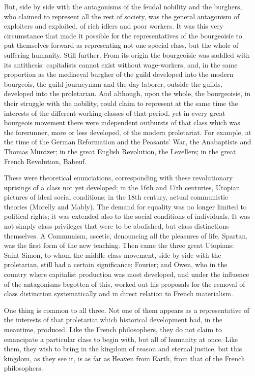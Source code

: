 \documentclass[oneside, 12pt]{book}
\begin{document}
But, side by side with the antagonisms of the feudal nobility and the burghers,
who claimed to represent all the rest of society, was the general antagonism of
exploiters and exploited, of rich idlers and poor workers. It was this very
circumstance that made it possible for the representatives of the bourgeoisie to
put themselves forward as representing not one special class, but the whole of
suffering humanity. Still further. From its origin the bourgeoisie was saddled
with its antithesis: capitalists cannot exist without wage-workers, and, in the
same proportion as the mediaeval burgher of the guild developed into the modern
bourgeois, the guild journeyman and the day-laborer, outside the guilds,
developed into the proletarian. And although, upon the whole, the bourgeoisie,
in their struggle with the nobility, could claim to represent at the same time
the interests of the different working-classes of that period, yet in every
great bourgeois movement there were independent outbursts of that class which
was the forerunner, more or less developed, of the modern proletariat. For
example, at the time of the German Reformation and the Peasants' War, the
Anabaptists and Thomas Müntzer; in the great English Revolution, the Levellers;
in the great French Revolution, Babeuf.

These were theoretical enunciations, corresponding with these revolutionary
uprisings of a class not yet developed; in the 16th and 17th centuries, Utopian
pictures of ideal social conditions; in the 18th century, actual communistic
theories (Morelly and Mably). The demand for equality was no longer limited to %
political rights; it was extended also to the social conditions of individuals.
It was not simply class privileges that were to be abolished, but class
distinctions themselves. A Communism, ascetic, denouncing all the pleasures of
life, Spartan, was the first form of the new teaching. Then came the three great
Utopians: Saint-Simon, to whom the middle-class movement, side by side with the
proletarian, still had a certain significance; Fourier; and Owen, who in the
country where capitalist production was most developed, and under the influence
of the antagonisms begotten of this, worked out his proposals for the removal of
class distinction systematically and in direct relation to French materialism.

One thing is common to all three. Not one of them appears as a representative of
the interests of that proletariat which historical development had, in the
meantime, produced. Like the French philosophers, they do not claim to
emancipate a particular class to begin with, but all of humanity at once. Like
them, they wish to bring in the kingdom of reason and eternal justice, but this
kingdom, as they see it, is as far as Heaven from Earth, from that of the French
philosophers.
\end{document}
